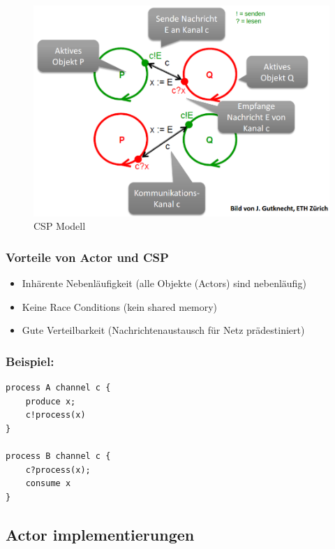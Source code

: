 \begin{figure}[h!]
	\centering
	\includegraphics[width=0.7\linewidth]{img/csp_model}
	\caption{CSP Modell}
	\label{fig:cspmodel}
\end{figure}


\subsubsection{Vorteile von Actor und CSP}

\begin{itemize}
	\item Inhärente Nebenläufigkeit (alle Objekte (Actors) sind nebenläufig)
	\item Keine Race Conditions (kein shared memory)
	\item Gute Verteilbarkeit (Nachrichtenaustausch für Netz prädestiniert)
\end{itemize}

\subsubsection{Beispiel:}

\begin{lstlisting}
process A channel c {
	produce x;
	c!process(x)
}

process B channel c {
	c?process(x);
	consume x
}
\end{lstlisting}

\subsection{Actor implementierungen}

